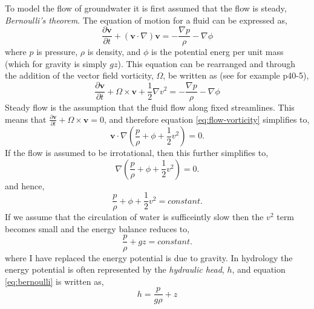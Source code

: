 To model the flow of groundwater it is first assumed that the flow is steady, \emph{Bernoulli's theorem}. The equation of motion for a fluid can be expressed as,
\begin{equation}
\frac{\partial \mathbf{v}}{\partial t} + \left(\mathbf{v} \cdot \nabla \right)\mathbf{v} = -\frac{\nabla p}{\rho} - \nabla\phi
\label{eq:flow}
\end{equation}
where $p$ is pressure, $\rho$ is density, and $\phi$ is the potential energ per unit mass (which for gravity is simply $gz$). This equation can be rearranged and through the addition of the vector field vorticity, $\Omega$, be written as (see for example \citealp{feynman-1964} p40-5),
\begin{equation}
\frac{\partial \mathbf{v}}{\partial t} + \Omega \times \mathbf{v} + \frac{1}{2}\nabla v^{2} = -\frac{\nabla p}{\rho} - \nabla\phi
\label{eq:flow-vorticity}
\end{equation}
Steady flow is the assumption that the fluid flow along fixed streamlines. This means that $\frac{\partial \mathbf{v}}{\partial t} + \Omega \times \mathbf{v} = 0$, and therefore equation \ref{eq:flow-vorticity} simplifies to,
\begin{equation}
\mathbf{v} \cdot \nabla \left(\frac{p}{\rho} + \phi + \frac{1}{2}v^{2} \right) = 0.
\end{equation}
If the flow is assumed to be irrotational, then this further simplifies to,
\begin{equation}
\nabla \left(\frac{p}{\rho} + \phi + \frac{1}{2}v^{2} \right) = 0.
\end{equation}
and hence,
\begin{equation}
\frac{p}{\rho} + \phi + \frac{1}{2}v^{2}  = constant.
\end{equation}
If we assume that the circulation of water is sufficeintly slow then the $v^{2}$ term becomes small and the energy balance reduces to,
\begin{equation}
\frac{p}{\rho} + gz  = constant.
\label{eq:bernoulli}
\end{equation}
where I have replaced the energy potential is due to gravity. In hydrology the energy potential is often represented by the \emph{hydraulic head}, $h$, and equation \ref{eq:bernoulli} is written as,
\begin{equation}
h = \frac{p}{g\rho} + z
\end{equation}

